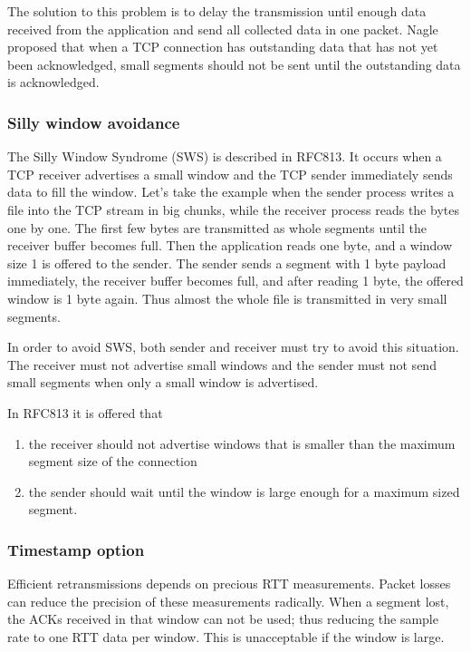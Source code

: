 The solution to this problem is to delay the transmission until
enough data received from the application and send all collected
data in one packet. Nagle proposed that
when a TCP connection has outstanding data that has not
yet been acknowledged, small segments should not be sent
until the outstanding data is acknowledged.

\subsubsection*{Silly window avoidance}

The Silly Window Syndrome (SWS) is described in RFC813. It occurs when
a TCP receiver advertises a small window and the TCP sender immediately
sends data to fill the window. Let's take the example when the sender
process writes a file into the TCP stream in big chunks, while the
receiver process reads the bytes one by one. The first few bytes
are transmitted as whole segments until the receiver buffer
becomes full. Then the application reads one
byte, and a window size 1 is offered to the sender. The sender sends
a segment with 1 byte payload immediately, the receiver buffer becomes
full, and after reading 1 byte, the offered window is 1 byte again.
Thus almost the whole file is transmitted in very small segments.

In order to avoid SWS, both sender and receiver must try to avoid this
situation. The receiver must not advertise small windows and the sender
must not send small segments when only a small window is advertised.

In RFC813 it is offered that
\begin{enumerate}
  \item the receiver should not advertise windows that is smaller than the maximum
        segment size of the connection
  \item the sender should wait until the window is large enough for a maximum sized
        segment.
\end{enumerate}

\subsubsection*{Timestamp option}

Efficient retransmissions depends on precious RTT measurements.
Packet losses can reduce the precision of these measurements radically.
When a segment lost, the ACKs received in that window can not be used;
thus reducing the sample rate to one RTT data per window. This is
unacceptable if the window is large.

